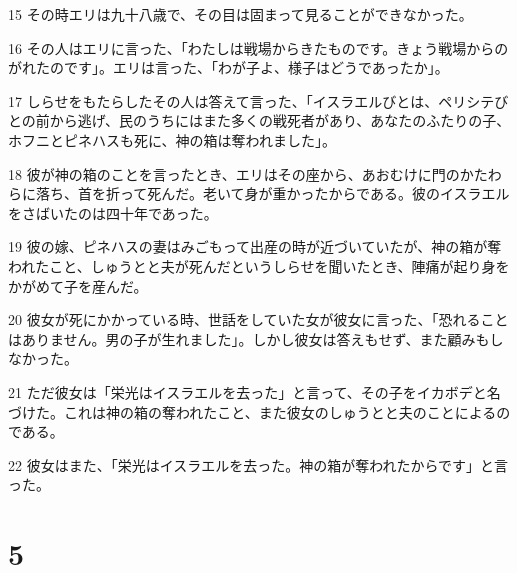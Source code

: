 \par 15 その時エリは九十八歳で、その目は固まって見ることができなかった。
\par 16 その人はエリに言った、「わたしは戦場からきたものです。きょう戦場からのがれたのです」。エリは言った、「わが子よ、様子はどうであったか」。
\par 17 しらせをもたらしたその人は答えて言った、「イスラエルびとは、ペリシテびとの前から逃げ、民のうちにはまた多くの戦死者があり、あなたのふたりの子、ホフニとピネハスも死に、神の箱は奪われました」。
\par 18 彼が神の箱のことを言ったとき、エリはその座から、あおむけに門のかたわらに落ち、首を折って死んだ。老いて身が重かったからである。彼のイスラエルをさばいたのは四十年であった。
\par 19 彼の嫁、ピネハスの妻はみごもって出産の時が近づいていたが、神の箱が奪われたこと、しゅうとと夫が死んだというしらせを聞いたとき、陣痛が起り身をかがめて子を産んだ。
\par 20 彼女が死にかかっている時、世話をしていた女が彼女に言った、「恐れることはありません。男の子が生れました」。しかし彼女は答えもせず、また顧みもしなかった。
\par 21 ただ彼女は「栄光はイスラエルを去った」と言って、その子をイカボデと名づけた。これは神の箱の奪われたこと、また彼女のしゅうとと夫のことによるのである。
\par 22 彼女はまた、「栄光はイスラエルを去った。神の箱が奪われたからです」と言った。

\chapter{5}

